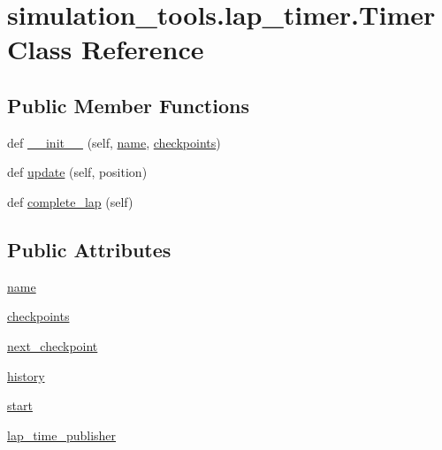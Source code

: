 \hypertarget{classsimulation__tools_1_1lap__timer_1_1_timer}{}\section{simulation\+\_\+tools.\+lap\+\_\+timer.\+Timer Class Reference}
\label{classsimulation__tools_1_1lap__timer_1_1_timer}
\subsection*{Public Member Functions}
\begin{DoxyCompactItemize}
\item 
def \hyperlink{classsimulation__tools_1_1lap__timer_1_1_timer_a526781ad4e5c09fbe04dda1e5a3f3fd9}{\+\_\+\+\_\+init\+\_\+\+\_\+} (self, \hyperlink{classsimulation__tools_1_1lap__timer_1_1_timer_a9bf911e55976cb1d04b10440cea407c1}{name}, \hyperlink{classsimulation__tools_1_1lap__timer_1_1_timer_ae042ce601347d175584be16d8166a74e}{checkpoints})
\item 
def \hyperlink{classsimulation__tools_1_1lap__timer_1_1_timer_ae9b21a99e315e66e34311c6b9feeb0e8}{update} (self, position)
\item 
def \hyperlink{classsimulation__tools_1_1lap__timer_1_1_timer_a9fac2e869ccbcd86651e333301d8cc33}{complete\+\_\+lap} (self)
\end{DoxyCompactItemize}
\subsection*{Public Attributes}
\begin{DoxyCompactItemize}
\item 
\hyperlink{classsimulation__tools_1_1lap__timer_1_1_timer_a9bf911e55976cb1d04b10440cea407c1}{name}
\item 
\hyperlink{classsimulation__tools_1_1lap__timer_1_1_timer_ae042ce601347d175584be16d8166a74e}{checkpoints}
\item 
\hyperlink{classsimulation__tools_1_1lap__timer_1_1_timer_a74b19b620b1f59ce1d558524c275f4c3}{next\+\_\+checkpoint}
\item 
\hyperlink{classsimulation__tools_1_1lap__timer_1_1_timer_a5f5e50dc374ab88c05748ab49392b881}{history}
\item 
\hyperlink{classsimulation__tools_1_1lap__timer_1_1_timer_afc51d0e4a6aa0e19be5c8622352b9afe}{start}
\item 
\hyperlink{classsimulation__tools_1_1lap__timer_1_1_timer_a2c9523f33bcf2a72cebb7ccc056a1f53}{lap\+\_\+time\+\_\+publisher}
\end{DoxyCompactItemize}


